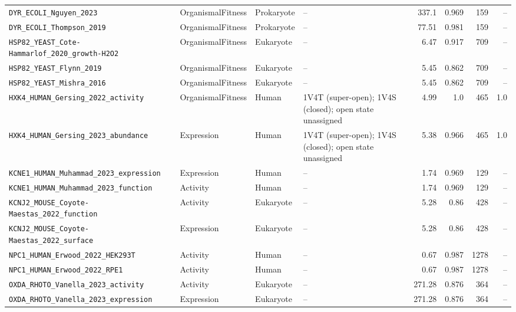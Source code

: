 \documentclass{article}
\begin{document}
\begin{longtable}{llllrrrr}
  \texttt{\scriptsize DYR\_ECOLI\_Nguyen\_2023} & OrganismalFitness & Prokaryote & {\scriptsize --} & 337.1 & 0.969 & 159 & -- \\
  \texttt{\scriptsize DYR\_ECOLI\_Thompson\_2019} & OrganismalFitness & Prokaryote & {\scriptsize --} & 77.51 & 0.981 & 159 & -- \\
  \texttt{\scriptsize HSP82\_YEAST\_Cote-Hammarlof\_2020\_growth-H2O2} & OrganismalFitness & Eukaryote & {\scriptsize --} & 6.47 & 0.917 & 709 & -- \\
  \texttt{\scriptsize HSP82\_YEAST\_Flynn\_2019} & OrganismalFitness & Eukaryote & {\scriptsize --} & 5.45 & 0.862 & 709 & -- \\
  \texttt{\scriptsize HSP82\_YEAST\_Mishra\_2016} & OrganismalFitness & Eukaryote & {\scriptsize --} & 5.45 & 0.862 & 709 & -- \\
  \texttt{\scriptsize HXK4\_HUMAN\_Gersing\_2022\_activity} & OrganismalFitness & Human & {\scriptsize 1V4T (super-open); 1V4S (closed); open state unassigned} & 4.99 & 1.0 & 465 & 1.0 \\
  \texttt{\scriptsize HXK4\_HUMAN\_Gersing\_2023\_abundance} & Expression & Human & {\scriptsize 1V4T (super-open); 1V4S (closed); open state unassigned} & 5.38 & 0.966 & 465 & 1.0 \\
  \texttt{\scriptsize KCNE1\_HUMAN\_Muhammad\_2023\_expression} & Expression & Human & {\scriptsize --} & 1.74 & 0.969 & 129 & -- \\
  \texttt{\scriptsize KCNE1\_HUMAN\_Muhammad\_2023\_function} & Activity & Human & {\scriptsize --} & 1.74 & 0.969 & 129 & -- \\
  \texttt{\scriptsize KCNJ2\_MOUSE\_Coyote-Maestas\_2022\_function} & Activity & Eukaryote & {\scriptsize --} & 5.28 & 0.86 & 428 & -- \\
  \texttt{\scriptsize KCNJ2\_MOUSE\_Coyote-Maestas\_2022\_surface} & Expression & Eukaryote & {\scriptsize --} & 5.28 & 0.86 & 428 & -- \\
  \texttt{\scriptsize NPC1\_HUMAN\_Erwood\_2022\_HEK293T} & Activity & Human & {\scriptsize --} & 0.67 & 0.987 & 1278 & -- \\
  \texttt{\scriptsize NPC1\_HUMAN\_Erwood\_2022\_RPE1} & Activity & Human & {\scriptsize --} & 0.67 & 0.987 & 1278 & -- \\
  \texttt{\scriptsize OXDA\_RHOTO\_Vanella\_2023\_activity} & Activity & Eukaryote & {\scriptsize --} & 271.28 & 0.876 & 364 & -- \\
  \texttt{\scriptsize OXDA\_RHOTO\_Vanella\_2023\_expression} & Expression & Eukaryote & {\scriptsize --} & 271.28 & 0.876 & 364 & -- \\

\end{longtable}
\end{document}
